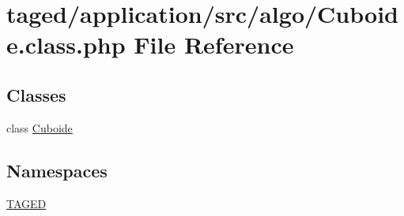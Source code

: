 \hypertarget{_cuboide_8class_8php}{}\section{taged/application/src/algo/\+Cuboide.class.\+php File Reference}
\label{_cuboide_8class_8php}
\subsection*{Classes}
\begin{DoxyCompactItemize}
\item 
class \hyperlink{class_cuboide}{Cuboide}
\end{DoxyCompactItemize}
\subsection*{Namespaces}
\begin{DoxyCompactItemize}
\item 
 \hyperlink{namespace_t_a_g_e_d}{T\+A\+G\+ED}
\end{DoxyCompactItemize}
